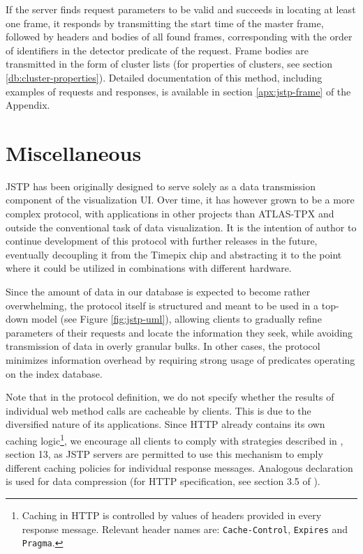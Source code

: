 If the server finds request parameters to be valid and succeeds in locating at least one frame, it responds by transmitting the start time of the master frame, followed by headers and bodies of all found frames, corresponding with the order of identifiers in the detector predicate of the request. Frame bodies are transmitted in the form of cluster lists (for properties of clusters, see section \ref{db:cluster-properties}). Detailed documentation of this method, including examples of requests and responses, is available in section \ref{apx:jstp-frame} of the Appendix.

\section{Miscellaneous}
JSTP has been originally designed to serve solely as a data transmission component of the visualization UI. Over time, it has however grown to be a more complex protocol, with applications in other projects than ATLAS-TPX and outside the conventional task of data visualization. It is the intention of author to continue development of this protocol with further releases in the future, eventually decoupling it from the Timepix chip and abstracting it to the point where it could be utilized in combinations with different hardware.

Since the amount of data in our database is expected to become rather overwhelming, the protocol itself is structured and meant to be used in a top-down model (see Figure \ref{fig:jstp-uml}), allowing clients to gradually refine parameters of their requests and locate the information they seek, while avoiding transmission of data in overly granular bulks. In other cases, the protocol minimizes information overhead by requiring strong usage of predicates operating on the index database.

Note that in the protocol definition, we do not specify whether the results of individual web method calls are cacheable by clients. This is due to the diversified nature of its applications. Since HTTP already contains its own caching logic\footnote{Caching in HTTP is controlled by values of headers provided in every response message. Relevant header names are: \texttt{Cache-Control}, \texttt{Expires} and \texttt{Pragma}.}, we encourage all clients to comply with strategies described in \cite{HTTP1999}, section 13, as JSTP servers are permitted to use this mechanism to emply different caching policies for individual response messages. Analogous declaration is used for data compression (for HTTP specification, see section 3.5 of \cite{HTTP1999}).

